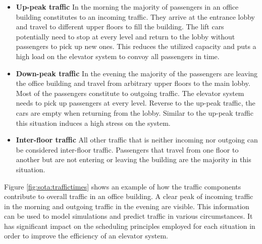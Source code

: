 \begin{itemize}
    \item \textbf{Up-peak traffic} In the morning the majority of passengers in an office building constitutes to an incoming traffic.
    They arrive at the entrance lobby and travel to different upper floors to fill the building.
    The lift cars potentially need to stop at every level and return to the lobby without passengers to pick up new ones. 
    This reduces the utilized capacity and puts a high load on the elevator system to convoy all passengers in time.
    \item \textbf{Down-peak traffic} In the evening the majority of the passengers are leaving the office building and travel from arbitrary upper floors to the main lobby.
    Most of the passengers constitute to outgoing traffic.
    The elevator system needs to pick up passengers at every level. 
    Reverse to the up-peak traffic, the cars are empty when returning from the lobby.
    Similar to the up-peak traffic this situation induces a high stress on the system.
    \item \textbf{Inter-floor traffic} All other traffic that is neither incoming nor outgoing can be considered inter-floor traffic. Passengers that travel from one floor to another but are not entering or leaving the building are the majority in this situation.
\end{itemize}

Figure \ref{fig:sota:traffictimes} shows an example of how the traffic components contribute to overall traffic in an office building. A clear peak of incoming traffic in the morning and outgoing traffic in the evening are visible.
This information can be used to model simulations and predict traffic in various circumstances.
It has significant impact on the scheduling principles employed for each situation in order to improve the efficiency of an elevator system.



